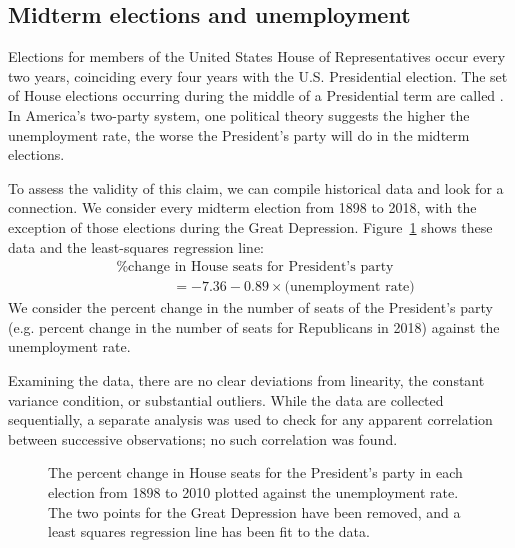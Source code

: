 \subsection{Midterm elections and unemployment}


Elections for members of the United States House
of Representatives occur every two years, coinciding
every four years with the U.S. Presidential election.
The set of House elections occurring during the middle
of a Presidential term are called
.
In America's two-party system, one political theory
suggests the higher the unemployment rate, the worse
the President's party will do in the midterm elections.

To assess the validity of this claim, we can compile
historical data and look for a connection.
We consider every midterm election from 1898 to 2018,
with the exception of those elections during the Great
Depression.
Figure~\ref{unemploymentAndChangeInHouse} shows these data
and the least-squares regression line: \vspace{-2mm}
\begin{align*}
&\text{\% change in House seats for President's party}  \\
&\qquad\qquad= -7.36 - 0.89 \times \text{(unemployment rate)}
\end{align*}
We consider the percent change in the number of seats
of the President's party (e.g. percent change in the number
of seats for Republicans in 2018) against the unemployment
rate.

Examining the data, there are no clear deviations from
linearity, the constant variance condition,
or substantial outliers.
While the data are collected sequentially, a separate analysis
was used to check for any apparent correlation between successive
observations;
no such correlation was found.

\begin{figure}[h]
  \centering
  \caption{The percent change in House seats for the
      President's party in each election from 1898 to 2010
      plotted against the unemployment rate.
      The two points for the Great Depression have been
      removed, and a least squares regression line has been
      fit to the data.}
  \label{unemploymentAndChangeInHouse}
\end{figure}

